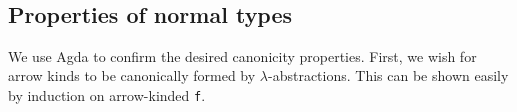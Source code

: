 \documentclass[authoryear, acmsmall, screen, review, nonacm]{acmart}
\begin{document}
\begin{code}[hide]
\>[0]\AgdaSpace{}%
\AgdaSpace{}%
\AgdaSymbol{(}\AgdaSpace{}%
\AgdaSymbol{)}\AgdaSpace{}%
\AgdaSymbol{=}\AgdaSpace{}%
\AgdaSpace{}%
\AgdaSymbol{(}\AgdaSpace{}%
\AgdaSpace{}%
\AgdaSymbol{)}\<%
\\
%
\\[\AgdaEmptyExtraSkip]%
\>[0]\AgdaSpace{}%
\AgdaSpace{}%
\AgdaSymbol{(}\AgdaSpace{}%
\AgdaSpace{}%
\AgdaSpace{}%
\AgdaOperator{\AgdaInductiveConstructor{\textasciitilde{}}}\AgdaSpace{}%
\AgdaSymbol{)}\AgdaSpace{}%
\AgdaSymbol{=}\AgdaSpace{}%
\AgdaSymbol{(}\AgdaSpace{}%
\AgdaSpace{}%
\AgdaSymbol{)}\AgdaSpace{}%
\AgdaSpace{}%
\AgdaSymbol{(}\AgdaSpace{}%
\AgdaSpace{}%
\AgdaSymbol{)}\AgdaSpace{}%
\AgdaOperator{\AgdaInductiveConstructor{\textasciitilde{}}}\AgdaSpace{}%
\AgdaSymbol{(}\AgdaSpace{}%
\AgdaSpace{}%
\AgdaSymbol{)}\<%
\\
\>[0]\AgdaSpace{}%
\AgdaSpace{}%
\AgdaSymbol{(}\AgdaSpace{}%
\AgdaSpace{}%
\AgdaSymbol{)}\AgdaSpace{}%
\AgdaSymbol{=}\AgdaSpace{}%
\AgdaSymbol{(}\AgdaSpace{}%
\AgdaSpace{}%
\AgdaSymbol{)}\AgdaSpace{}%
\AgdaSpace{}%
\AgdaSymbol{(}\AgdaSpace{}%
\AgdaSpace{}%
\AgdaSymbol{)}\<%
\\
%
\\[\AgdaEmptyExtraSkip]%
\>[0]\AgdaSpace{}%
\AgdaSymbol{=}\AgdaSpace{}%
\AgdaSpace{}%
\<%
\\
\>[0]\AgdaSpace{}%
\AgdaSymbol{=}\AgdaSpace{}%
\AgdaSpace{}%
\<%
\end{code}




\subsection{Properties of normal types}
We use Agda to confirm the desired canonicity properties. First, we wish for arrow kinds to be canonically formed by $\lambda$-abstractions. This can be shown easily by induction on arrow-kinded \verb!f!.
\end{document}
